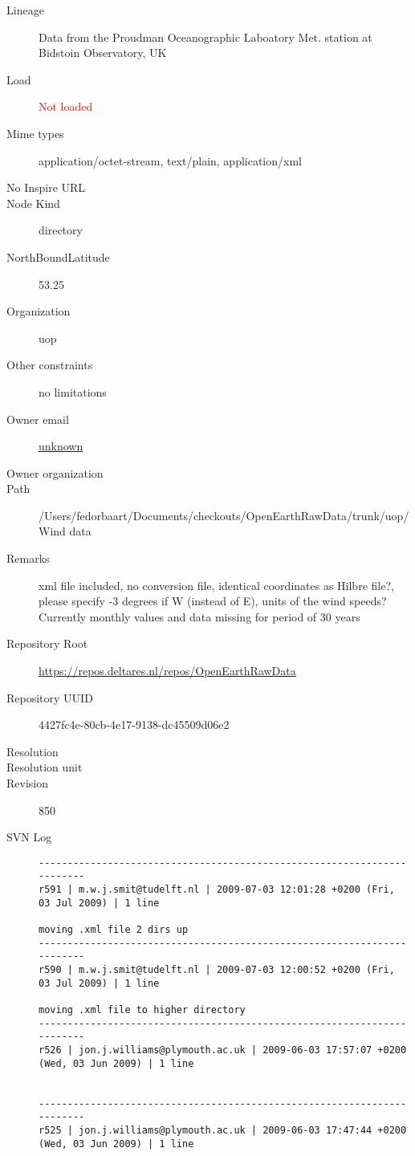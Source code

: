 \documentclass[9]{report}
\begin{document}
\begin{description}
  \item[Lineage] Data from the Proudman Oceanographic Laboatory Met. station at Bidstoin Observatory, UK
  \item[Load] \textcolor{red}{Not loaded}
  \item[Mime types] application/octet-stream, text/plain, application/xml
  \item[No Inspire URL] 
  \item[Node Kind] directory
  \item[NorthBoundLatitude] 53.25
  \item[Organization] uop
  \item[Other constraints] no limitations
  \item[Owner email] \href{mailto:unknown}{unknown}
  \item[Owner organization] 
  \item[Path] /Users/fedorbaart/Documents/checkouts/OpenEarthRawData/trunk/uop/Wind data
  \item[Remarks] xml file included, no conversion file, identical coordinates as Hilbre file?, please specify -3 degrees if W (instead of E), units of the wind speeds? Currently monthly values and data missing for period of 30 years
  \item[Repository Root] \href{https://repos.deltares.nl/repos/OpenEarthRawData}{https://repos.deltares.nl/repos/OpenEarthRawData}
  \item[Repository UUID] 4427fc4e-80cb-4e17-9138-dc45509d06e2
  \item[Resolution] 
  \item[Resolution unit] 
  \item[Revision] 850
  \item[SVN Log] \begin{verbatim}
------------------------------------------------------------------------
r591 | m.w.j.smit@tudelft.nl | 2009-07-03 12:01:28 +0200 (Fri, 03 Jul 2009) | 1 line

moving .xml file 2 dirs up
------------------------------------------------------------------------
r590 | m.w.j.smit@tudelft.nl | 2009-07-03 12:00:52 +0200 (Fri, 03 Jul 2009) | 1 line

moving .xml file to higher directory
------------------------------------------------------------------------
r526 | jon.j.williams@plymouth.ac.uk | 2009-06-03 17:57:07 +0200 (Wed, 03 Jun 2009) | 1 line


------------------------------------------------------------------------
r525 | jon.j.williams@plymouth.ac.uk | 2009-06-03 17:47:44 +0200 (Wed, 03 Jun 2009) | 1 line



\end{verbatim}
\end{description}
\end{document}
